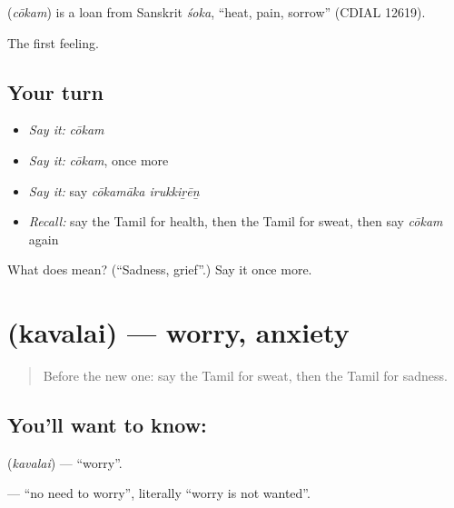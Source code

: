 \begin{cousinweb}
\textbf{} (\emph{cōkam}) is a loan from Sanskrit \emph{śoka}, \textquotedblleft{}heat, pain, sorrow\textquotedblright{} (CDIAL 12619).
\end{cousinweb}

\begin{grammarlens}[title={What you've built}]
The first feeling.
\end{grammarlens}

\subsection*{Your turn}
\begin{itemize}
\raggedright
  \item \emph{Say it:} \emph{cōkam}
  \item \emph{Say it:} \emph{cōkam}, once more
  \item \emph{Say it:} say \emph{cōkamāka irukkiṟēṉ}
  \item \emph{Recall:} say the Tamil for health, then the Tamil for sweat, then say \emph{cōkam} again
\end{itemize}

\begin{tcolorbox}[breakable,colback=teal!4,colframe=teal!35!black,title={Before you move on}]
What does  mean? (\textquotedblleft{}Sadness, grief\textquotedblright{}.) Say it once more.
\end{tcolorbox}
\section[\texorpdfstring{\ta{கவலை} (kavalai)}{கவலை (kavalai)}]{ (kavalai) — worry, anxiety}

\label{lesson:TA-C89-worry}



\begin{quote}
Before the new one: say the Tamil for sweat, then the Tamil for sadness.
\end{quote}

\subsection*{You'll want to know: }
\textbf{} (\emph{kavalai}) — \textquotedblleft{}worry\textquotedblright{}.

\textbf{ } — \textquotedblleft{}no need to worry\textquotedblright{}, literally \textquotedblleft{}worry is not wanted\textquotedblright{}.

